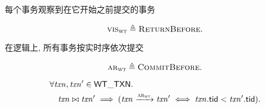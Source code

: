 \begin{frame}{}
  \begin{center}
	每个事务观察到在它开始之前提交的事务
  \end{center}

  \begin{definition}
	\[
	  \textsc{vis}_{\textsc{wt}} \triangleq \textsc{ReturnBefore}.
	\]
  \end{definition}

  \vspace{0.80cm}
  \begin{center}
	在逻辑上, 所有事务按实时序依次提交
  \end{center}
  \begin{definition}
	\[
	  \textsc{ar}_{\textsc{wt}} \triangleq \textsc{CommitBefore}.
	\]
  \end{definition}
\end{frame}

\begin{frame}{}
  \begin{lemma}[冲突事务的提交顺序]
	\vspace{-0.30cm}
    \begin{align*}
      &\forall \mathit{txn}, \mathit{txn}' \in {\sf WT\_TXN}.\; \\
        &\quad \mathit{txn} \bowtie \mathit{txn}' \implies (\mathit{txn} \xrightarrow{\textsc{ar}_{\textsc{wt}}} \mathit{txn}'
          \iff \mathit{txn}.{\sf tid} < \mathit{txn}'.{\sf tid}).
    \end{align*}
  \end{lemma}
\end{frame}
